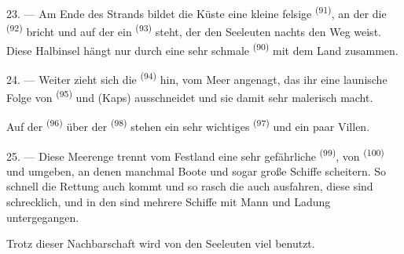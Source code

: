 23. --- Am Ende des Strands bildet die Küste eine kleine felsige 
\textsuperscript{(91)}, an der die  \textsuperscript{(92)} bricht und
auf der ein  \textsuperscript{(93)} steht, der den Seeleuten
nachts den Weg weist. Diese Halbinsel hängt nur durch eine sehr schmale
 \textsuperscript{(90)} mit dem Land zusammen.

\VUsaut{3.0mm}
\VUsaut{3.0mm}

24. --- Weiter zieht sich die  \textsuperscript{(94)} hin, vom Meer
angenagt, das ihr eine launische Folge von  \textsuperscript{(95)} und
 (Kaps) ausschneidet und sie damit sehr malerisch macht.

Auf der  \textsuperscript{(96)} über der 
\textsuperscript{(98)} stehen ein sehr wichtiges  \textsuperscript{(97)}
und ein paar Villen.

25. --- Diese Meerenge trennt vom Festland eine sehr gefährliche 
\textsuperscript{(99)}, von  \textsuperscript{(100)} und
 umgeben, an denen manchmal Boote und sogar große Schiffe scheitern.
So schnell die Rettung auch kommt und so rasch die  auch
ausfahren, diese  sind schrecklich, und in den
 sind mehrere Schiffe mit Mann und Ladung untergegangen.

Trotz dieser Nachbarschaft wird  von den Seeleuten viel benutzt.
\VUsaut{6.0mm}
\VUfilet{22mm}
